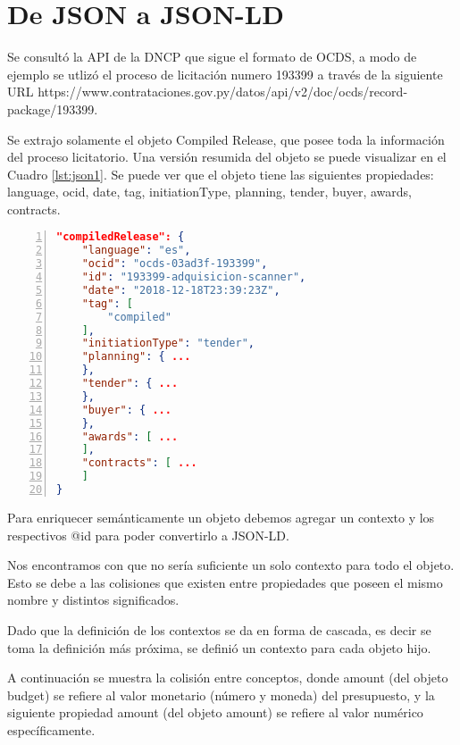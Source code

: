 \section{De JSON a JSON-LD}


Se consultó la API de la DNCP que sigue el formato de OCDS, a modo de ejemplo se utlizó el proceso de licitación numero 193399 a través de la siguiente URL https://www.contrataciones.gov.py/datos/api/v2/doc/ocds/record-package/193399.

Se extrajo solamente el objeto Compiled Release, que posee toda la información del proceso licitatorio. Una versión resumida del objeto se puede visualizar en el Cuadro \ref{lst:json1}. Se puede ver que el objeto tiene las siguientes propiedades: language, ocid, date, tag, initiationType, planning, tender, buyer, awards, contracts.\hfill \break

\noindent\begin{minipage}{\textwidth}
\begin{lstlisting}[captionpos=b, caption=Objeto JSON del OCDS de un Compiled Release, label=lst:json1,  numbers=left, language=json, numberstyle=\tiny\color{mygray},frame=single]
"compiledRelease": {
    "language": "es",
    "ocid": "ocds-03ad3f-193399",
    "id": "193399-adquisicion-scanner",
    "date": "2018-12-18T23:39:23Z",
    "tag": [
        "compiled"
    ],
    "initiationType": "tender",
    "planning": { ...
    },
    "tender": { ...
    },
    "buyer": { ...
    },
    "awards": [ ...
    ],
    "contracts": [ ...
    ]
}
\end{lstlisting}
\end{minipage}


Para enriquecer semánticamente un objeto debemos agregar un contexto y los respectivos @id para poder convertirlo a JSON-LD. 

Nos encontramos con que no sería suficiente un solo contexto para todo el objeto. Esto se debe a las colisiones que existen entre propiedades que poseen el mismo nombre y distintos significados.

Dado que la definición de los contextos se da en forma de cascada, es decir se toma la definición más próxima, se definió un contexto para cada objeto hijo.

A continuación se muestra la colisión entre conceptos, donde amount (del objeto budget) se refiere al valor monetario (número y moneda) del presupuesto, y la siguiente propiedad amount (del objeto amount) se refiere al valor numérico específicamente.\hfill \break

